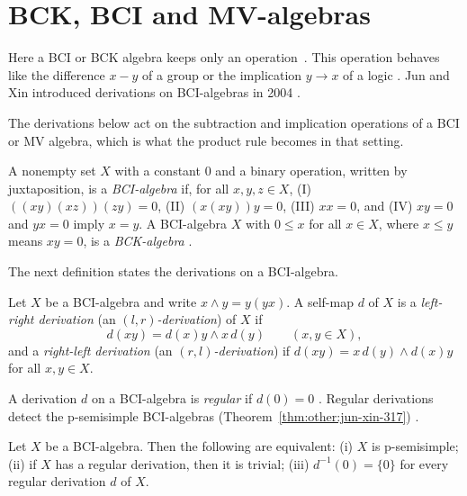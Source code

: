 \section{BCK, BCI and MV-algebras}\label{sec:other-systems:bci-mv}

Here a BCI or BCK algebra keeps only an operation~\cite[p.~167]{JunXin2004}.
This operation behaves like the difference
$x - y$ of a group or the implication $y \to x$ of a logic
\cite[p.~167]{JunXin2004}. Jun and Xin
introduced derivations on BCI-algebras in 2004
\cite[p.~167]{JunXin2004}.

The derivations below act on the subtraction and implication operations of a
BCI or MV algebra, which is what the product rule becomes in that setting.

\begin{definition}\label{def:other:bci}
A nonempty set $X$ with a constant $0$ and a binary operation, written by
juxtaposition, is a \emph{BCI-algebra} if, for all $x, y, z \in X$,
\textup{(I)} $((xy)(xz))(zy) = 0$,
\textup{(II)} $(x(xy))y = 0$,
\textup{(III)} $xx = 0$, and
\textup{(IV)} $xy = 0$ and $yx = 0$ imply $x = y$.
A BCI-algebra $X$ with $0 \le x$ for all $x \in X$, where $x \le y$ means
$xy = 0$, is a \emph{BCK-algebra} \cite[p.~168]{JunXin2004}.
\end{definition}

The next definition states the derivations on a BCI-algebra.

\begin{definition}\label{def:other:lr-derivation}
Let $X$ be a BCI-algebra and write $x \wedge y = y(yx)$. A self-map $d$
of $X$ is a \emph{left-right derivation} (an \emph{$(l, r)$-derivation})
of $X$ if
\[
d(xy) = d(x)y \wedge x\,d(y) \qquad (x, y \in X),
\]
and a \emph{right-left derivation} (an \emph{$(r, l)$-derivation}) if
$d(xy) = x\,d(y) \wedge d(x)y$ for all $x, y \in X$.
\end{definition}

A derivation $d$ on a BCI-algebra is \emph{regular} if $d(0) = 0$
\cite[Definition~3.12, p.~173]{JunXin2004}. Regular derivations detect
the p-semisimple BCI-algebras (Theorem~\ref{thm:other:jun-xin-317})
\cite[Theorem~3.17, p.~174]{JunXin2004}.\begin{theorem}\label{thm:other:jun-xin-317}
Let $X$ be a BCI-algebra. Then the following are equivalent:
\textup{(i)} $X$ is p-semisimple; \textup{(ii)} if $X$ has a regular
derivation, then it is trivial; \textup{(iii)} $d^{-1}(0) = \{0\}$ for
every regular derivation $d$ of $X$.
\end{theorem}

